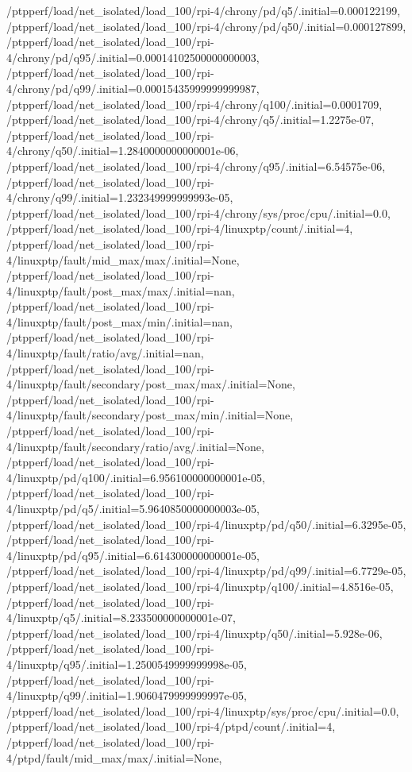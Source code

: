 {    /ptpperf/load/net_isolated/load_100/rpi-4/chrony/pd/q5/.initial=0.000122199,
    /ptpperf/load/net_isolated/load_100/rpi-4/chrony/pd/q50/.initial=0.000127899,
    /ptpperf/load/net_isolated/load_100/rpi-4/chrony/pd/q95/.initial=0.00014102500000000003,
    /ptpperf/load/net_isolated/load_100/rpi-4/chrony/pd/q99/.initial=0.00015435999999999987,
    /ptpperf/load/net_isolated/load_100/rpi-4/chrony/q100/.initial=0.0001709,
    /ptpperf/load/net_isolated/load_100/rpi-4/chrony/q5/.initial=1.2275e-07,
    /ptpperf/load/net_isolated/load_100/rpi-4/chrony/q50/.initial=1.2840000000000001e-06,
    /ptpperf/load/net_isolated/load_100/rpi-4/chrony/q95/.initial=6.54575e-06,
    /ptpperf/load/net_isolated/load_100/rpi-4/chrony/q99/.initial=1.232349999999993e-05,
    /ptpperf/load/net_isolated/load_100/rpi-4/chrony/sys/proc/cpu/.initial=0.0,
    /ptpperf/load/net_isolated/load_100/rpi-4/linuxptp/count/.initial=4,
    /ptpperf/load/net_isolated/load_100/rpi-4/linuxptp/fault/mid_max/max/.initial=None,
    /ptpperf/load/net_isolated/load_100/rpi-4/linuxptp/fault/post_max/max/.initial=nan,
    /ptpperf/load/net_isolated/load_100/rpi-4/linuxptp/fault/post_max/min/.initial=nan,
    /ptpperf/load/net_isolated/load_100/rpi-4/linuxptp/fault/ratio/avg/.initial=nan,
    /ptpperf/load/net_isolated/load_100/rpi-4/linuxptp/fault/secondary/post_max/max/.initial=None,
    /ptpperf/load/net_isolated/load_100/rpi-4/linuxptp/fault/secondary/post_max/min/.initial=None,
    /ptpperf/load/net_isolated/load_100/rpi-4/linuxptp/fault/secondary/ratio/avg/.initial=None,
    /ptpperf/load/net_isolated/load_100/rpi-4/linuxptp/pd/q100/.initial=6.956100000000001e-05,
    /ptpperf/load/net_isolated/load_100/rpi-4/linuxptp/pd/q5/.initial=5.9640850000000003e-05,
    /ptpperf/load/net_isolated/load_100/rpi-4/linuxptp/pd/q50/.initial=6.3295e-05,
    /ptpperf/load/net_isolated/load_100/rpi-4/linuxptp/pd/q95/.initial=6.614300000000001e-05,
    /ptpperf/load/net_isolated/load_100/rpi-4/linuxptp/pd/q99/.initial=6.7729e-05,
    /ptpperf/load/net_isolated/load_100/rpi-4/linuxptp/q100/.initial=4.8516e-05,
    /ptpperf/load/net_isolated/load_100/rpi-4/linuxptp/q5/.initial=8.233500000000001e-07,
    /ptpperf/load/net_isolated/load_100/rpi-4/linuxptp/q50/.initial=5.928e-06,
    /ptpperf/load/net_isolated/load_100/rpi-4/linuxptp/q95/.initial=1.2500549999999998e-05,
    /ptpperf/load/net_isolated/load_100/rpi-4/linuxptp/q99/.initial=1.9060479999999997e-05,
    /ptpperf/load/net_isolated/load_100/rpi-4/linuxptp/sys/proc/cpu/.initial=0.0,
    /ptpperf/load/net_isolated/load_100/rpi-4/ptpd/count/.initial=4,
    /ptpperf/load/net_isolated/load_100/rpi-4/ptpd/fault/mid_max/max/.initial=None,
}
